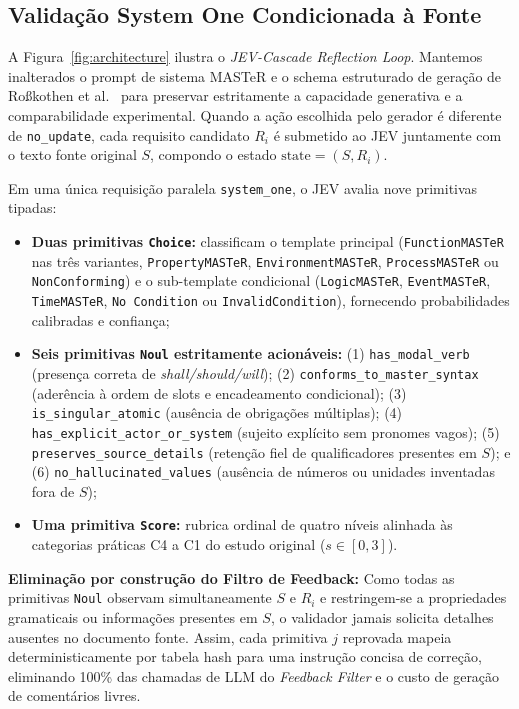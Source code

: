 \subsection{Validação System One Condicionada à Fonte}
A Figura~\ref{fig:architecture} ilustra o \textit{JEV-Cascade Reflection Loop}. Mantemos inalterados o prompt de sistema MASTeR e o schema estruturado de geração de Ro\ss kothen et al.~\cite{rosskothen2026converting} para preservar estritamente a capacidade generativa e a comparabilidade experimental. Quando a ação escolhida pelo gerador é diferente de \texttt{no\_update}, cada requisito candidato $R_i$ é submetido ao JEV juntamente com o texto fonte original $S$, compondo o estado $\text{state} = (S, R_i)$.

Em uma única requisição paralela \texttt{system\_one}, o JEV avalia nove primitivas tipadas:
\begin{itemize}
    \item \textbf{Duas primitivas \texttt{Choice}:} classificam o template principal (\texttt{FunctionMASTeR} nas três variantes, \texttt{PropertyMASTeR}, \texttt{EnvironmentMASTeR}, \texttt{ProcessMASTeR} ou \texttt{NonConforming}) e o sub-template condicional (\texttt{LogicMASTeR}, \texttt{EventMASTeR}, \texttt{TimeMASTeR}, \texttt{No Condition} ou \texttt{InvalidCondition}), fornecendo probabilidades calibradas e confiança;
    \item \textbf{Seis primitivas \texttt{Noul} estritamente acionáveis:} (1) \texttt{has\_modal\_verb} (presença correta de \textit{shall/should/will}); (2) \texttt{conforms\_to\_master\_syntax} (aderência à ordem de slots e encadeamento condicional); (3) \texttt{is\_singular\_atomic} (ausência de obrigações múltiplas); (4) \texttt{has\_explicit\_actor\_or\_system} (sujeito explícito sem pronomes vagos); (5) \texttt{preserves\_source\_details} (retenção fiel de qualificadores presentes em $S$); e (6) \texttt{no\_hallucinated\_values} (ausência de números ou unidades inventadas fora de $S$);
    \item \textbf{Uma primitiva \texttt{Score}:} rubrica ordinal de quatro níveis alinhada às categorias práticas C4 a C1 do estudo original ($s \in [0, 3]$).
\end{itemize}

\textbf{Eliminação por construção do Filtro de Feedback:} Como todas as primitivas \texttt{Noul} observam simultaneamente $S$ e $R_i$ e restringem-se a propriedades gramaticais ou informações presentes em $S$, o validador jamais solicita detalhes ausentes no documento fonte. Assim, cada primitiva $j$ reprovada mapeia deterministicamente por tabela hash para uma instrução concisa de correção, eliminando 100\% das chamadas de LLM do \textit{Feedback Filter} e o custo de geração de comentários livres.

